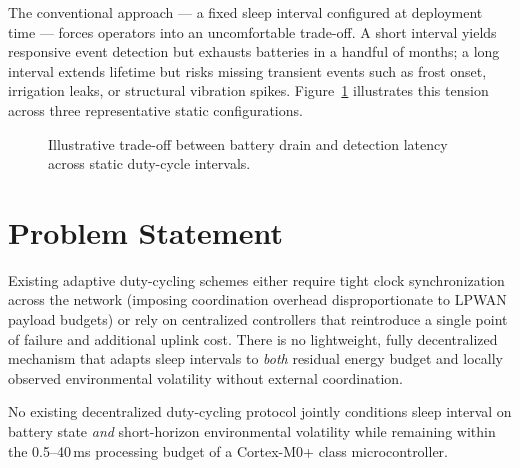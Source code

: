 \documentclass[12pt,a4paper]{report}
\begin{document}
The conventional approach --- a fixed sleep interval configured at deployment time --- forces
operators into an uncomfortable trade-off. A short interval yields responsive event detection
but exhausts batteries in a handful of months; a long interval extends lifetime but risks
missing transient events such as frost onset, irrigation leaks, or structural vibration
spikes. Figure~\ref{fig:tradeoff} illustrates this tension across three representative static
configurations.

\begin{figure}[H]
\centering
{}
\caption{Illustrative trade-off between battery drain and detection latency across static duty-cycle intervals.}
\label{fig:tradeoff}
\end{figure}

\section{Problem Statement}
Existing adaptive duty-cycling schemes either require tight clock synchronization across the
network (imposing coordination overhead disproportionate to LPWAN payload budgets) or rely on
centralized controllers that reintroduce a single point of failure and additional uplink
cost. There is no lightweight, fully decentralized mechanism that adapts sleep intervals to
\emph{both} residual energy budget and locally observed environmental volatility without
external coordination.

\begin{infobox}[title={\faFile\ Research Gap}]
No existing decentralized duty-cycling protocol jointly conditions sleep interval on
battery state \emph{and} short-horizon environmental volatility while remaining within the
0.5--40\,ms processing budget of a Cortex-M0+ class microcontroller.
\end{infobox}
\end{document}
